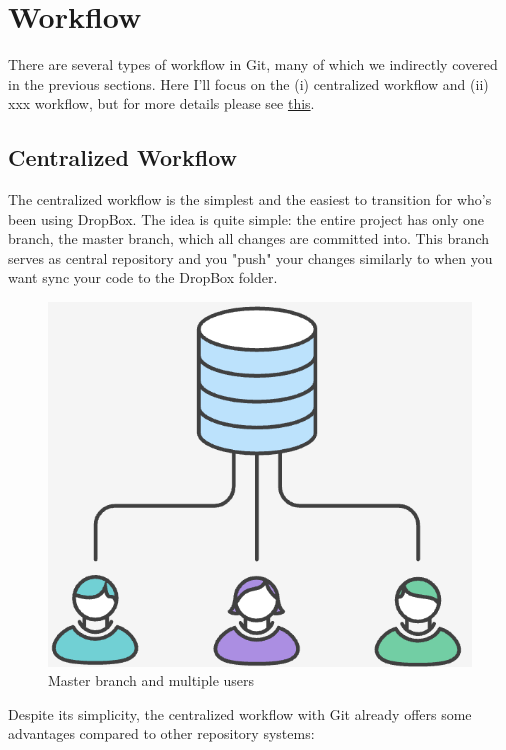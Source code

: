 \documentclass{article}
\begin{document}
\section{Workflow}
There are several types of workflow in Git, many of which we indirectly covered in the previous sections. Here I'll focus on the (i) centralized workflow and (ii) xxx workflow, but for more details please see \href{https://www.atlassian.com/git/tutorials/comparing-workflows}{this}.

\subsection{Centralized Workflow}
The centralized workflow is the simplest and the easiest to transition for who's been using DropBox. The idea is quite simple: the entire project has only one branch, the master branch, which all changes are committed into. This branch serves as central repository and you "push" your changes similarly to when you want sync your code to the DropBox folder. 

\begin{figure}[H]
	\caption{Master branch and multiple users}
	\includegraphics[scale=0.5]{images/CentralizedWorkflow.png}
	\centering
\end{figure}

Despite its simplicity, the centralized workflow with Git already offers some advantages compared to other repository systems:
\end{document}
